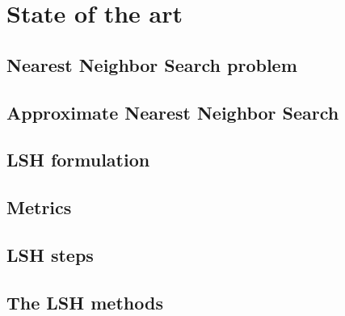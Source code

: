 \chapter{State of the art}

\section{Nearest Neighbor Search problem}


\section{Approximate Nearest Neighbor Search}





\section{LSH formulation}

\clearpage


\section{Metrics}
\label{sect:possible_metrics}

\clearpage

\section{LSH steps}

\clearpage

\section{The LSH methods}

